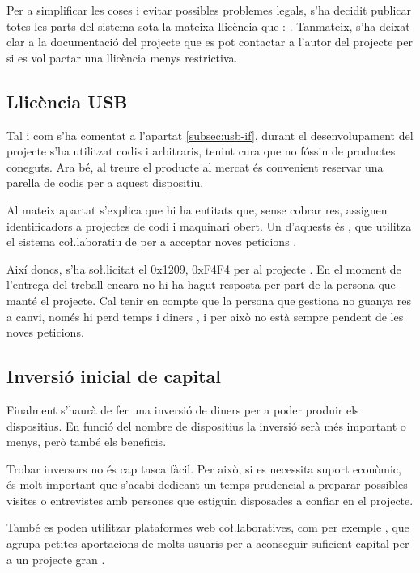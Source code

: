 Per a simplificar les coses i evitar possibles problemes legals, s'ha decidit
publicar totes les parts del sistema sota la mateixa llicència que :
. Tanmateix, s'ha deixat clar a la documentació del projecte que
es pot contactar a l'autor del projecte per si es vol pactar una llicència menys
restrictiva.

\subsection{Llicència USB}

Tal i com s'ha comentat a l'apartat \ref{subsec:usb-if}, durant el desenvolupament
del projecte s'ha utilitzat codis  i  arbitraris, tenint
cura que no fóssin de productes coneguts. Ara bé, al treure el producte al
mercat és convenient reservar una parella de codis per a aquest dispositiu.

Al mateix apartat s'explica que hi ha entitats que, sense cobrar res, assignen
identificadors a projectes de codi i maquinari obert. Un d'aquests és
, que utilitza el sistema co\l.laboratiu de  per a
acceptar noves peticions \cite{PidCodes}.

Així doncs, s'ha so\l.licitat el  0x1209, 0xF4F4 per al projecte
. En el moment de l'entrega del treball encara no hi ha hagut
resposta per part de la persona que manté el projecte. Cal tenir en compte que
la persona que gestiona  no guanya res a canvi, només hi perd
temps i diners \cite{PidCodesFaq}, i per això no està sempre pendent de
les noves peticions.

\subsection{Inversió inicial de capital}

Finalment s'haurà de fer una inversió de diners per a poder produir els
dispositius. En funció del nombre de dispositius la inversió serà més important
o menys, però també els beneficis.

Trobar inversors no és cap tasca fàcil. Per això, si es necessita suport
econòmic, és molt important que s'acabi dedicant un temps prudencial a preparar
possibles visites o entrevistes amb persones que estiguin disposades a confiar
en el projecte.

També es poden utilitzar plataformes web co\l.laboratives, com per exemple
, que agrupa petites aportacions de molts usuaris per a
aconseguir suficient capital per a un projecte gran \cite{Kickstarter}.
